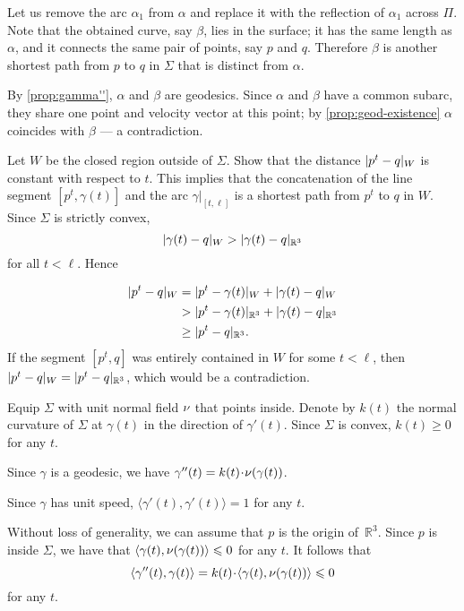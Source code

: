 Let us remove the arc $\alpha_1$ from $\alpha$ and replace it with the reflection of $\alpha_1$ across $\Pi$.
Note that the obtained curve, say $\beta$, lies in the surface; it has the same length as $\alpha$, and it connects the same pair of points, say $p$ and $q$.
Therefore $\beta$ is another shortest path from $p$ to $q$ in $\Sigma$ that is distinct from $\alpha$.

By \ref{prop:gamma''}, $\alpha$ and $\beta$ are geodesics.
Since $\alpha$ and $\beta$ have a common subarc, they share one point and velocity vector at this point;
by \ref{prop:geod-existence} $\alpha$ coincides with $\beta$ --- a contradiction.


 Let $W$ be the closed region outside of $\Sigma$. Show that the distance $\dist{p^t}{q}W$ is constant with respect to $t$. This implies that the concatenation of the line segment $[p^t,\gamma(t)]$ and the arc $\gamma|_{[t,\ell]}$ is a shortest path from $p^t$ to $q$  in $W$. Since $\Sigma$ is strictly convex, 
\[ \dist{\gamma (t)}{q}W > \dist{\gamma(t)}{q}{\mathbb{R}^3}  \]
for all $t < \ell$. Hence 

\[
\begin{aligned}
 \dist{p^t}{q}W  &=  \dist{p^t}{\gamma(t)}W + \dist{\gamma (t)}{q}W   
\\
&> \dist{p^t}{\gamma(t)}{\mathbb{R}^3} + \dist{ \gamma (t)}{q}{\mathbb{R}^3}   
\\
&\geq  \dist{p^t}{q}{\mathbb{R}^3}.   
\end{aligned}
\]
If the segment $[p^t , q ]$ was entirely contained in $W$ for some $t< \ell $, then $ \dist{p^t}{q}W = \dist{p^t}{q}{\mathbb{R}^3} $, which would be a contradiction.



Equip $\Sigma$ with unit normal field $\nu$ that points inside.
Denote by $k(t)$ the normal curvature of $\Sigma$ at $\gamma(t)$ in the direction of $\gamma'(t)$.
Since $\Sigma$ is convex, $k(t)\ge 0$ for any $t$.

Since $\gamma$ is a geodesic, we have $\gamma''(t)=k(t)\cdot\Norm(\gamma(t))$.

Since $\gamma$ has unit speed, $\langle\gamma'(t),\gamma'(t)\rangle=1$ for any $t$.

Without loss of generality, we can assume that $p$ is the origin of~$\mathbb{R}^3$.
Since $p$ is inside $\Sigma$, we have that $\langle\gamma(t),\nu(\gamma(t))\rangle\leqslant 0$ for any $t$.
It follows that 
\[\langle\gamma''(t),\gamma(t)\rangle=k(t)\cdot \langle\gamma(t),\Norm(\gamma(t))\rangle\le 0\]
for any $t$.

